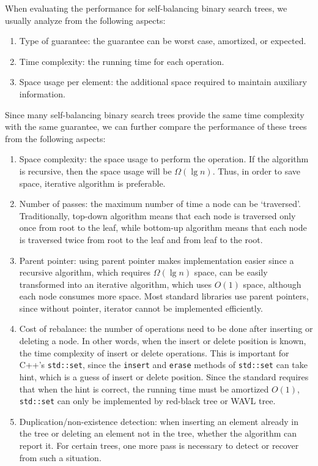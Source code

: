 When evaluating the performance for self-balancing binary search trees, we usually analyze from the following aspects:
\begin{enumerate}
    \item Type of guarantee: the guarantee can be worst case, amortized, or expected.
    \item Time complexity: the running time for each operation.
    \item Space usage per element: the additional space required to maintain auxiliary information.
\end{enumerate}

Since many self-balancing binary search trees provide the same time complexity with the same guarantee, we can further compare the performance of these trees from the following aspects:
\begin{enumerate}
    \item Space complexity: the space usage to perform the operation. If the algorithm is recursive, then the space usage will be $\Omega(\lg n)$. Thus, in order to save space, iterative algorithm is preferable.
    \item Number of passes: the maximum number of time a node can be `traversed'. Traditionally, top-down algorithm means that each node is traversed only once from root to the leaf, while bottom-up algorithm means that each node is traversed twice from root to the leaf and from leaf to the root.
    \item Parent pointer: using parent pointer makes implementation easier since a recursive algorithm, which requires $\Omega(\lg n)$ space, can be easily transformed into an iterative algorithm, which uses $O(1)$ space, although each node consumes more space. Most standard libraries use parent pointers, since without pointer, iterator cannot be implemented efficiently.
    \item Cost of rebalance: the number of operations need to be done after inserting or deleting a node. In other words, when the insert or delete position is known, the time complexity of insert or delete operations. This is important for C++'s \texttt{std::set}, since the \texttt{insert} and \texttt{erase} methods of \texttt{std::set} can take hint, which is a guess of insert or delete position. Since the standard requires that when the hint is correct, the running time must be amortized $O(1)$, \texttt{std::set} can only be implemented by red-black tree or WAVL tree.
    \item Duplication/non-existence detection: when inserting an element already in the tree or deleting an element not in the tree, whether the algorithm can report it. For certain trees, one more pass is necessary to detect or recover from such a situation.
\end{enumerate}

